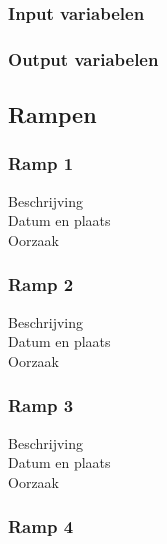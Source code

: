 \documentclass{article}
\begin{document}
\begin{description}
\subsubsection{Input variabelen}
\subsubsection{Output variabelen}

\subsection{Rampen}

\subsubsection{Ramp 1}
\begin{description}
\item[Beschrijving]
\item[Datum en plaats] 
\item[Oorzaak]
\end{description}

\subsubsection{Ramp 2}
\begin{description}
\item[Beschrijving]
\item[Datum en plaats] 
\item[Oorzaak]
\end{description}

\subsubsection{Ramp 3}
\begin{description}
\item[Beschrijving]
\item[Datum en plaats] 
\item[Oorzaak]
\end{description}

\subsubsection{Ramp 4}

\end{description}
\end{document}
